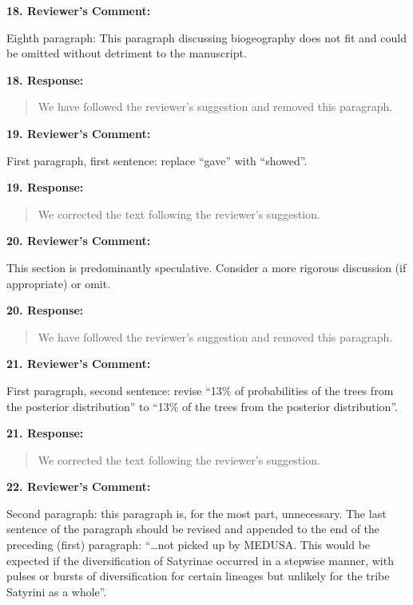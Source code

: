 \documentclass[]{article}
\begin{document}
\textbf{18. Reviewer's Comment:}

Eighth paragraph: This paragraph discussing biogeography does not fit
and could be omitted without detriment to the manuscript.

\textbf{18. Response:}

\begin{quote}
\color{blue}
We have followed the reviewer's suggestion and removed this paragraph.
\end{quote}

\textbf{19. Reviewer's Comment:}

First paragraph, first sentence: replace ``gave'' with ``showed''.

\textbf{19. Response:}

\begin{quote}
\color{blue}
We corrected the text following the reviewer's suggestion.
\end{quote}

\textbf{20. Reviewer's Comment:}

This section is predominantly speculative. Consider a more rigorous
discussion (if appropriate) or omit.

\textbf{20. Response:}

\begin{quote}
\color{blue}
We have followed the reviewer's suggestion and removed this paragraph.
\end{quote}

\textbf{21. Reviewer's Comment:}

First paragraph, second sentence: revise ``13\% of probabilities of the
trees from the posterior distribution'' to ``13\% of the trees from the
posterior distribution''.

\textbf{21. Response:}

\begin{quote}
\color{blue}
\color{blue}
\color{blue}
We corrected the text following the reviewer's suggestion.
\end{quote}

\textbf{22. Reviewer's Comment:}

Second paragraph: this paragraph is, for the most part, unnecessary. The
last sentence of the paragraph should be revised and appended to the end
of the preceding (first) paragraph: ``\ldots{}not picked up by MEDUSA.
This would be expected if the diversification of Satyrinae occurred in a
stepwise manner, with pulses or bursts of diversification for certain
lineages but unlikely for the tribe Satyrini as a whole''.
\end{document}
